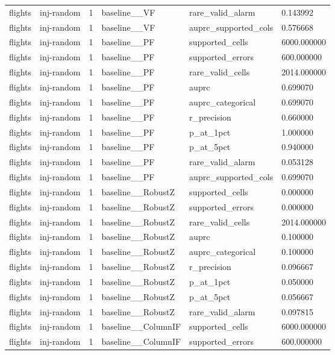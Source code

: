 \begin{tabular}{llllll}
flights & inj-random & 1 & baseline\_\_VF & rare\_valid\_alarm & 0.143992 \\
flights & inj-random & 1 & baseline\_\_VF & auprc\_supported\_cols & 0.576668 \\
flights & inj-random & 1 & baseline\_\_PF & supported\_cells & 6000.000000 \\
flights & inj-random & 1 & baseline\_\_PF & supported\_errors & 600.000000 \\
flights & inj-random & 1 & baseline\_\_PF & rare\_valid\_cells & 2014.000000 \\
flights & inj-random & 1 & baseline\_\_PF & auprc & 0.699070 \\
flights & inj-random & 1 & baseline\_\_PF & auprc\_categorical & 0.699070 \\
flights & inj-random & 1 & baseline\_\_PF & r\_precision & 0.660000 \\
flights & inj-random & 1 & baseline\_\_PF & p\_at\_1pct & 1.000000 \\
flights & inj-random & 1 & baseline\_\_PF & p\_at\_5pct & 0.940000 \\
flights & inj-random & 1 & baseline\_\_PF & rare\_valid\_alarm & 0.053128 \\
flights & inj-random & 1 & baseline\_\_PF & auprc\_supported\_cols & 0.699070 \\
flights & inj-random & 1 & baseline\_\_RobustZ & supported\_cells & 0.000000 \\
flights & inj-random & 1 & baseline\_\_RobustZ & supported\_errors & 0.000000 \\
flights & inj-random & 1 & baseline\_\_RobustZ & rare\_valid\_cells & 2014.000000 \\
flights & inj-random & 1 & baseline\_\_RobustZ & auprc & 0.100000 \\
flights & inj-random & 1 & baseline\_\_RobustZ & auprc\_categorical & 0.100000 \\
flights & inj-random & 1 & baseline\_\_RobustZ & r\_precision & 0.096667 \\
flights & inj-random & 1 & baseline\_\_RobustZ & p\_at\_1pct & 0.050000 \\
flights & inj-random & 1 & baseline\_\_RobustZ & p\_at\_5pct & 0.056667 \\
flights & inj-random & 1 & baseline\_\_RobustZ & rare\_valid\_alarm & 0.097815 \\
flights & inj-random & 1 & baseline\_\_ColumnIF & supported\_cells & 6000.000000 \\
flights & inj-random & 1 & baseline\_\_ColumnIF & supported\_errors & 600.000000 \\

\end{tabular}
